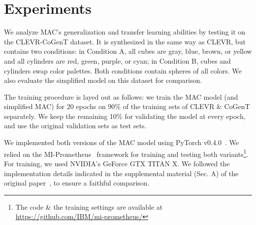 \section{Experiments}

We analyze MAC's generalization and transfer learning abilities by testing it on the CLEVR-CoGenT dataset. It is synthesized in the same way as CLEVR, but contains two conditions: in Condition A, all cubes are gray, blue, brown, or yellow and all cylinders are red, green, purple, or cyan; in Condition B, cubes and cylinders swap color palettes. Both conditions contain spheres of all colors. We also evaluate the simplified model on this dataset for comparison.

The training procedure is layed out as follows: we train the MAC model (and simplified MAC) for 20 epochs on 90\% of the training sets of CLEVR \& CoGenT separately. We keep the remaining 10\% for validating the model at every epoch, and use the original validation sets as test sets.

We implemented both versions of the MAC model using PyTorch v0.4.0~\cite{paszke2017automatic}. We relied on the MI-Prometheus~\cite{kornuta2018accelerating} framework for training and testing both variants\footnote{The code \& the training settings are available at \url{https://github.com/IBM/mi-prometheus/}}. For training, we used NVIDIA's GeForce GTX TITAN X. We followed the implementation details indicated in the  supplemental material (Sec. A) of the original paper~\cite{hudson2018compositional}, to ensure a faithful comparison.

